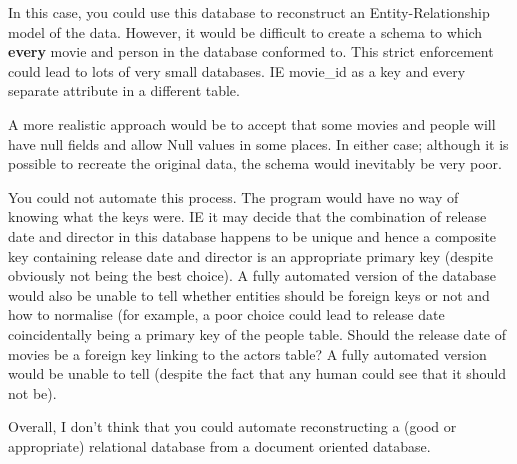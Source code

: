 \documentclass[10pt,\jkfside,a4paper]{article}
\begin{document}
\begin{enumerate}
In this case, you could use this database to reconstruct an Entity-Relationship model 
of the data. However, it would be difficult to create a schema to which \textbf{every} 
movie and person in the database conformed to. This strict enforcement could lead to 
lots of very small databases. IE movie\_id as a key and every separate attribute in a 
different table.

A more realistic approach would be to accept that some movies and people will have 
null fields and allow Null values in some places. 
In either case; although it is possible to recreate the original data, the schema would 
inevitably be very poor.

You could not automate this process. The program would have no way of knowing what 
the keys were. IE it may decide that the combination of release date and director in 
this database happens to be unique and hence a composite key containing release date and director is an 
appropriate primary key (despite obviously not being the best choice).
A fully automated version of the database would also be unable to tell whether entities 
should be foreign keys or not and how to normalise (for example, a poor choice could lead 
to release date coincidentally being a primary key of the people table. Should the release 
date of movies be a foreign key linking to the actors table? 
A fully automated version would be unable to tell (despite 
the fact that any human could see that it should not be).

Overall, I don't think that you could automate reconstructing a (good or appropriate) relational database from 
a document oriented database.

\end{enumerate}
\end{document}
